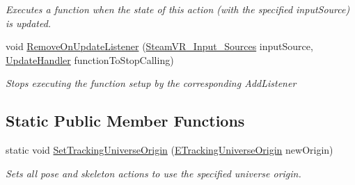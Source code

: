 \begin{DoxyCompactItemize}
\begin{DoxyCompactList}\small\item\em Executes a function when the state of this action (with the specified input\+Source) is updated. \end{DoxyCompactList}\item 
void \mbox{\hyperlink{class_valve_1_1_v_r_1_1_steam_v_r___action___pose_ae825ca07325b80170162b81d48f83070}{Remove\+On\+Update\+Listener}} (\mbox{\hyperlink{namespace_valve_1_1_v_r_a82e5bf501cc3aa155444ee3f0662853f}{Steam\+V\+R\+\_\+\+Input\+\_\+\+Sources}} input\+Source, \mbox{\hyperlink{class_valve_1_1_v_r_1_1_steam_v_r___action___pose_a243e7046a430c572e5be3d1b6b322b6d}{Update\+Handler}} function\+To\+Stop\+Calling)
\begin{DoxyCompactList}\small\item\em Stops executing the function setup by the corresponding Add\+Listener \end{DoxyCompactList}\end{DoxyCompactItemize}
\subsection*{Static Public Member Functions}
\begin{DoxyCompactItemize}
\item 
static void \mbox{\hyperlink{class_valve_1_1_v_r_1_1_steam_v_r___action___pose_affeffcb59fcccfbd30d21960498a34d1}{Set\+Tracking\+Universe\+Origin}} (\mbox{\hyperlink{namespace_valve_1_1_v_r_a29be99a3c2f780157bd490db06a7f12f}{E\+Tracking\+Universe\+Origin}} new\+Origin)
\begin{DoxyCompactList}\small\item\em Sets all pose and skeleton actions to use the specified universe origin. \end{DoxyCompactList}\end{DoxyCompactItemize}

